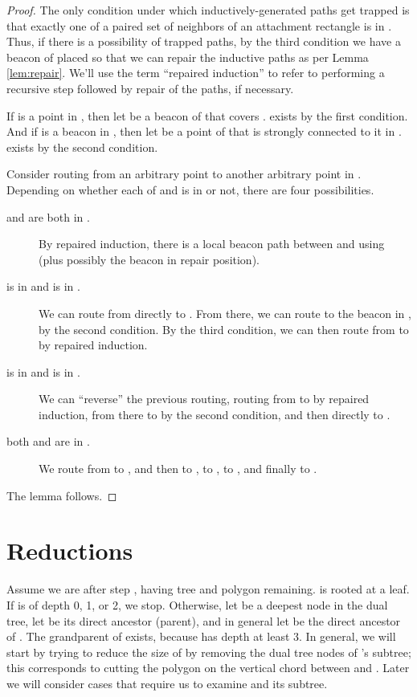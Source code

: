 \documentclass{article}
\begin{document}
	\begin{proof}
		The only condition under which inductively-generated paths get trapped is that
		exactly one of a paired set of neighbors of an attachment rectangle is in
		.
		Thus, if there is a possibility of trapped paths, by the third condition we
		have a beacon of  placed so that we can repair the inductive paths as per
		Lemma \ref{lem:repair}.
		We'll use the term ``repaired induction'' to refer to performing a recursive
		step followed by repair of the paths, if necessary.
		
		If  is a point in , then let  be a beacon of  that covers
		.   exists by the first condition.  And if  is a beacon in ,
		then let  be a point of  that is strongly connected to
		it in .   exists by the second condition.
		
		Consider routing from an
		arbitrary point  to another arbitrary point  in .
		Depending on whether each of  and  is in  or not, there are
		four possibilities.

		\begin{description}
		\item[ and  are both in .]
			By repaired induction, there is a local beacon path between  and 
			using  (plus possibly the beacon in repair position).

		\item[ is in  and  is in .]
			We can route from  directly to .
			From there, we can route to the beacon  in ,
			by the second condition.
			By the third condition,
			we can then route from  to  by
			repaired induction.

		\item[ is in  and  is in .] 
			We can ``reverse'' the previous routing,
			routing from  to  by repaired induction,
			from there to  by the second condition,
			and then directly to .
		
		\item[both  and  are in .]
			We route from  to , and then to ,
			to , to , and finally to .
		\end{description}
		
		The lemma follows.

	\end{proof}


\section{Reductions}\label{sec:reductions}

	Assume we are after step , having tree  and polygon  remaining.
	 is rooted at a leaf.
	If  is of depth 0, 1, or 2, we stop.
	Otherwise, let  be a deepest node in the dual
	tree, let  be its direct ancestor (parent),
	and in general let  be the direct ancestor of .
	The grandparent  of  exists,
	because  has depth at least 3.
	In general, we will start by trying to reduce the size of 
	by removing the dual tree nodes of 's subtree;
	this corresponds to cutting the polygon on the vertical chord
	between  and .  Later we will consider cases that require
	us to examine  and its subtree.
			
\end{document}
